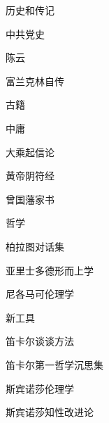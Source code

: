 历史和传记
\begin{enumbox} 
\item 中共党史
\item 陈云
\item 富兰克林自传
\end{enumbox} 

古籍
\begin{enumbox} 
\item 中庸
\item 大乘起信论
\item 黄帝阴符经
\item 曾国藩家书
\end{enumbox} 

哲学
\begin{enumbox} 
\item 柏拉图对话集
\item 亚里士多德形而上学
\item 尼各马可伦理学
\item 新工具
\item 笛卡尔谈谈方法
\item 笛卡尔第一哲学沉思集
\item 斯宾诺莎伦理学
\item 斯宾诺莎知性改进论
\end{enumbox} 
